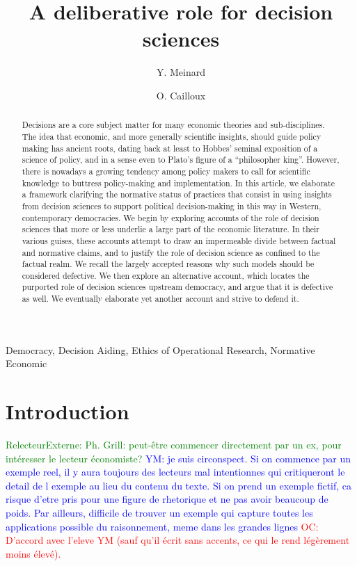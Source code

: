 \documentclass[preprint,11pt]{elsarticle}
\newcommand{\commentYM}[1]{\textcolor{blue}{YM: #1}}
\newcommand{\commentOC}[1]{\textcolor{red}{OC: #1}}
\newcommand{\commentE}[1]{\textcolor{green}{RelecteurExterne: #1}}
\begin{document}
\title{A deliberative role for decision sciences}
\author[ld]{Y. Meinard}
\author[ld]{O. Cailloux}
\address[ld]{Universit\'e Paris-Dauphine, PSL Research University, CNRS, UMR [7243], LAMSADE, 75016 PARIS, FRANCE}



\begin{abstract}
Decisions are a core subject matter for many economic theories and sub-disciplines. The idea that economic, and more generally scientific insights, should guide policy making has ancient roots, dating back at least to Hobbes’ seminal exposition of a science of policy, and in a sense even to Plato's figure of a ``philosopher king''. However, there is nowadays a growing tendency among policy makers to call for scientific knowledge to buttress policy-making and implementation. In this article, we elaborate a framework clarifying the normative status of practices that consist in using insights from decision sciences to support political decision-making in this way in Western, contemporary democracies. We begin by exploring accounts of the role of decision sciences that more or less underlie a large part of the economic literature. In their various guises, these accounts attempt to draw an impermeable divide between factual and normative claims, and to justify the role of decision science as confined to the factual realm. We recall the largely accepted reasons why such models should be considered defective. We then explore an alternative account, which locates the purported role of decision sciences upstream democracy, and argue that it is defective as well. We eventually elaborate yet another account and strive to defend it.

\end{abstract}

\begin{keyword}
Democracy, Decision Aiding, Ethics of Operational Research, Normative Economic
\end{keyword}

\maketitle

\section{Introduction}

\commentE{Ph. Grill: peut-être commencer directement par un ex, pour intéresser le lecteur économiste?}
\commentYM{je suis circonspect. Si on commence par un exemple reel, il y aura toujours des lecteurs mal intentionnes qui critiqueront le detail de l exemple au lieu du contenu du texte. Si on prend un exemple fictif, ca risque d'etre pris pour une figure de rhetorique et ne pas avoir beaucoup de poids. Par ailleurs, difficile de trouver un exemple qui capture toutes les applications possible du raisonnement, meme dans les grandes lignes}
\commentOC{D’accord avec l’eleve YM (sauf qu’il écrit sans accents, ce qui le rend légèrement moins élevé).}
\end{document}
